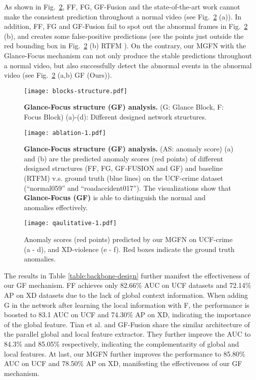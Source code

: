 \documentclass[letterpaper]{article} \usepackage{aaai23}  \usepackage{times}  \usepackage{helvet}  \usepackage{courier}  \usepackage[hyphens]{url}  \usepackage{graphicx} \urlstyle{rm} \def\UrlFont{\rm}  \usepackage{natbib}  \usepackage{caption} \frenchspacing  \setlength{\pdfpagewidth}{8.5in}  \setlength{\pdfpageheight}{11in}  \usepackage{algorithm}
\newcommand{\etal}{{et al. }}
\begin{document}
As shown in Fig.~\ref{fig:ablation-1}, FF, FG, GF-Fusion and the state-of-the-art work \cite{RTFM} cannot make the consistent prediction throughout a normal video (see Fig.~\ref{fig:ablation-1} (a)). In addition, FF, FG and GF-Fusion fail to spot out the abnormal frames in Fig.~\ref{fig:ablation-1} (b), and \cite{RTFM} creates some false-positive predictions (see the points just outside the red bounding box in Fig.~\ref{fig:ablation-1} (b) RTFM \cite{RTFM}). On the contrary, our MGFN with the Glance-Focus mechanism can not only produce the stable predictions throughout a normal video, but also successfully detect the abnormal events in the abnormal video (see Fig.~\ref{fig:ablation-1} (a,b) GF (Ours)). 


\begin{figure}[!t]
\centering
\texttt{[image: blocks-structure.pdf]}
\vspace{-5mm}
\caption{\textbf{Glance-Focus structure (GF) analysis.} (G: Glance Block, F: Focus Block) (a)-(d): Different designed network structures.}
\vspace{-3mm}
\label{fig:blocks-structure}
\end{figure}


\begin{figure}[!t]
\centering
\texttt{[image: ablation-1.pdf]}
\vspace{-5mm}
\caption{\textbf{Glance-Focus structure (GF) analysis.} (AS: anomaly score) (a) and (b) are the predicted anomaly scores (red points) of different designed structures (FF, FG, GF-FUSION and GF) and baseline (RTFM) v.s. ground truth (blue lines) on the UCF-crime dataset (``normal059'' and ``roadaccident017''). The visualizations show that \textbf{Glance-Focus (GF)} is able to distinguish the normal and anomalies effectively. }
\vspace{-1mm}
\label{fig:ablation-1}
\end{figure}

\begin{figure}[!t]
\centering
\texttt{[image: qaulitative-1.pdf]}
\vspace{-5mm}
\caption{Anomaly scores (red points) predicted by our MGFN on UCF-crime (a - d), and XD-violence (e - f). Red boxes indicate the ground truth anomalies.}
\label{fig:qualitative-1}
\end{figure}


The results in Table \ref{table:backbone-design} further manifest the effectiveness of our GF mechanism. FF achieves only 82.66\% AUC on UCF datasets and 72.14\% AP on XD datasets due to the lack of global context information. When adding G in the network after learning the local information with F, the performance is boosted to 83.1 AUC on UCF and 74.30\% AP on XD, indicating the importance of the global feature. Tian \etal \cite{RTFM} and GF-Fusion
share the similar architecture of the parallel global and local feature extractor. They further improve the AUC to 84.3\% and 85.05\% respectively, indicating the complementarity of global and local features. At last, our MGFN further improves the performance to 85.80\% AUC on UCF and 78.50\% AP on XD, manifesting the effectiveness of our GF mechanism. 
\end{document}
